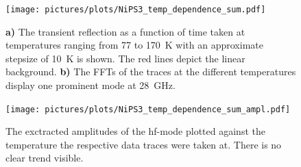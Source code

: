 \begin{figure}[hbt!]
    \centering
    \texttt{[image: pictures/plots/NiPS3\_temp\_dependence\_sum.pdf]} \vspace{-0.3cm}
    \caption{\textbf{a)} The transient reflection as a function of time taken at temperatures ranging from 77 to \qty{170}{K} with an approximate stepsize of \qty{10}{K} is shown. The red lines depict the linear background. \textbf{b)} The FFTs of the traces at the different temperatures display one prominent mode at \qty{28}{GHz}.}
    \label{fig:NiPS3_temp_dependence_sum}
\end{figure}
\begin{figure}[hbt!]
    \centering  
    \texttt{[image: pictures/plots/NiPS3\_temp\_dependence\_sum\_ampl.pdf]} \vspace{-0.3cm}
    \caption{The exctracted amplitudes of the hf-mode plotted against the temperature the respective data traces were taken at. There is no clear trend visible.}
    \label{fig:NiPS3_temp_dependence_sum_ampl}
\end{figure}
\FloatBarrier


